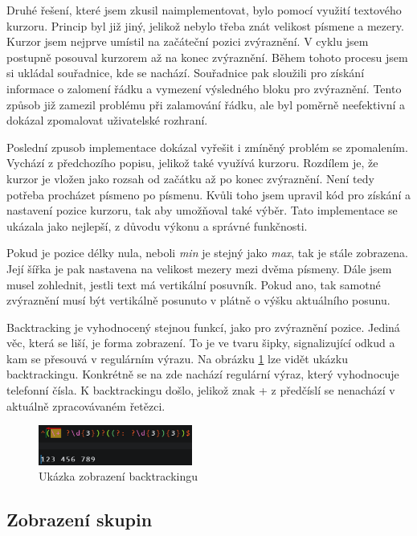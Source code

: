 Druhé řešení, které jsem zkusil naimplementovat, bylo pomocí využití textového kurzoru.
Princip byl již jiný, jelikož nebylo třeba znát velikost písmene a mezery.
Kurzor jsem nejprve umístil na začáteční pozici zvýraznění. 
V cyklu jsem postupně posouval kurzorem až na konec zvýraznění.
Během tohoto procesu jsem si ukládal souřadnice, kde se nachází.
Souřadnice pak sloužili pro získání informace o zalomení řádku a vymezení výsledného bloku pro zvýraznění.
Tento způsob již zamezil problému při zalamování řádku, ale byl poměrně neefektivní a dokázal zpomalovat uživatelské rozhraní.

Poslední zpusob implementace dokázal vyřešit i zmíněný problém se zpomalením.
Vychází z předchozího popisu, jelikož také využívá kurzoru.
Rozdílem je, že kurzor je vložen jako rozsah od začátku až po konec zvýraznění.
Není tedy potřeba procházet písmeno po písmenu.
Kvůli toho jsem upravil kód pro získání a nastavení pozice kurzoru, tak aby umožňoval také výběr.
Tato implementace se ukázala jako nejlepší, z důvodu výkonu a správné funkčnosti.

Pokud je pozice délky nula, neboli \textit{min} je stejný jako \textit{max}, tak je stále zobrazena. 
Její šířka je pak nastavena na velikost mezery mezi dvěma písmeny. 
Dále jsem musel zohlednit, jestli text má vertikální posuvník. 
Pokud ano, tak samotné zvýraznění musí být vertikálně posunuto v plátně o výšku aktuálního posunu.

Backtracking je vyhodnocený stejnou funkcí, jako pro zvýraznění pozice.
Jediná věc, která se liší, je forma zobrazení. 
To je ve tvaru šipky, signalizující odkud a kam se přesouvá v regulárním výrazu.
Na obrázku \ref{fig:backtrackingShowcase} lze vidět ukázku backtrackingu.
Konkrétně se na zde nachází regulární výraz, který vyhodnocuje telefonní čísla.
K backtrackingu došlo, jelikož znak + z předčíslí se nenachází v aktuálně zpracovávaném řetězci.

\begin{figure}[!h]
	\centering
	\includegraphics[width=0.45\textwidth]{Figures/backtrackingShowcase.png}
	\caption{Ukázka zobrazení backtrackingu}
	\label{fig:backtrackingShowcase}
\end{figure} 

\subsection*{Zobrazení skupin}

